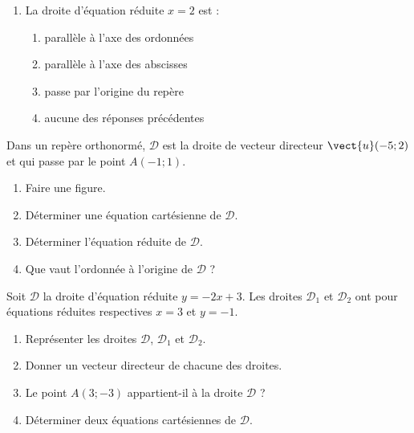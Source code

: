 \documentclass[a4paper]{article}
\begin{document}
\begin{enumerate}
    \begin{multicols}{4}
      \begin{enumerate}
	\item $7x+2y-10=0$
	\item $14x+4y+20=0$
	\item $-2x-7y-10=0$
	\item $-7x-2y=0$
      \end{enumerate}
    \end{multicols}
  \item La droite d'équation réduite $x=2$ est :
    \begin{multicols}{4}
      \begin{enumerate}
	\item parallèle à l'axe des ordonnées
	\item parallèle à l'axe des abscisses
	\item passe par l'origine du repère
	\item aucune des réponses précédentes
      \end{enumerate} 
    \end{multicols} 
\end{enumerate}

\smallskip

\exo[4 points] Dans un repère orthonormé, $\mathcal{D}$ est la droite de vecteur directeur $\vect{u}(-5;2)$ et qui passe par le point $A(-1;1)$.
\begin{enumerate}
  \item Faire une figure.
  \item Déterminer une équation cartésienne de $\mathcal{D}$.
  \item Déterminer l'équation réduite de $\mathcal{D}$.
  \item Que vaut l'ordonnée à l'origine de $\mathcal{D}$ ?
\end{enumerate}

\smallskip

\exo[5 points] Soit $\mathcal{D}$ la droite d'équation réduite $y=-2x+3$. Les droites $\mathcal{D}_1$ et $\mathcal{D}_2$ ont pour équations réduites respectives $x=3$ et $y=-1$.
\begin{enumerate}
  \item Représenter les droites $\mathcal{D}$, $\mathcal{D}_1$ et $\mathcal{D}_2$.
  \item Donner un vecteur directeur de chacune des droites.
  \item Le point $A(3;-3)$ appartient-il à la droite $\mathcal{D}$ ?
  \item Déterminer deux équations cartésiennes de $\mathcal{D}$.
\end{enumerate}
\end{document}

